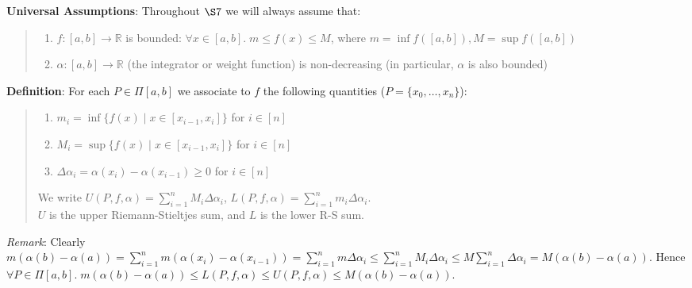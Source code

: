 \documentclass[11pt]{article}
\begin{document}
\textbf{Universal Assumptions}: Throughout $\S 7$ we will always assume that:
\begin{quote}\vspace{-0.3cm}
	\begin{enumerate}
	\item $f : [a,b] \to \mathbb{R}$ is bounded: $\forall x \in [a,b].\; m \leq f(x) \leq M$, where $m = \inf f([a,b]), M = \sup f([a,b])$
	\item $\alpha : [a, b] \to \mathbb{R}$ (the integrator or weight function) is non-decreasing (in particular, $\alpha$ is also bounded)
	\end{enumerate}
\end{quote}

\textbf{Definition}: For each $P \in \Pi[a,b]$ we associate to $f$ the following quantities ($P = \{x_0, \ldots, x_n\}$):
\begin{quote}\vspace{-0.3cm}
	\begin{enumerate}
	\item $m_i = \inf \{f(x) \mid x \in [x_{i-1}, x_i]\}$ for $i \in [n]$
	\item $M_i = \sup \{f(x) \mid x \in [x_{i-1}, x_i]\}$ for $i \in [n]$
	\item $\Delta \alpha_i = \alpha(x_i) - \alpha(x_{i-1}) \geq 0$ for $i \in [n]$
	\end{enumerate}

	We write $U(P, f, \alpha) = \sum_{i=1}^n M_i \Delta \alpha_i$, $L(P, f, \alpha) = \sum_{i=1}^n m_i \Delta \alpha_i$.\\
$U$ is the upper Riemann-Stieltjes sum, and $L$ is the lower R-S sum.
\end{quote}

\emph{Remark}: Clearly $m(\alpha(b) - \alpha(a)) = \sum_{i=1}^n m(\alpha(x_i) - \alpha(x_{i-1})) = \sum_{i=1}^n m \Delta \alpha_i \leq \sum_{i=1}^n M_i \Delta \alpha_i \leq M \sum_{i=1}^n \Delta \alpha_i = M(\alpha(b) - \alpha(a))$. Hence $\forall P \in \Pi[a,b].\; m(\alpha(b) - \alpha(a)) \leq L(P, f, \alpha) \leq U(P, f, \alpha) \leq M(\alpha(b) - \alpha(a))$.\\
\end{document}
